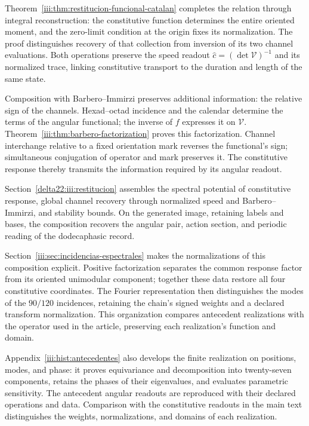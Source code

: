 Theorem~\ref{iii:thm:restitucion-funcional-catalan} completes the
relation through integral reconstruction: the constitutive function
determines the entire oriented moment, and the zero-limit condition
at the origin fixes its normalization. The proof distinguishes recovery
of that collection from inversion of its two channel evaluations.
Both operations preserve the speed readout
$\widehat c=(\det\mathcal V)^{-1}$ and its normalized trace, linking
constitutive transport to the duration and length of the same state.

Composition with Barbero--Immirzi preserves additional information:
the relative sign of the channels. Hexad--octad incidence and the
calendar determine the terms of the angular functional; the inverse
of $f$ expresses it on $\mathcal V$.
Theorem~\ref{iii:thm:barbero-factorization} proves this
factorization. Channel interchange relative to a fixed orientation
mark reverses the functional's sign; simultaneous conjugation of
operator and mark preserves it. The constitutive response thereby
transmits the information required by its angular readout.

\par
Section~\ref{delta22:iii:restitucion} assembles the spectral potential of constitutive response, global channel recovery through normalized speed and Barbero--Immirzi, and stability bounds. On the generated image, retaining labels and bases, the composition recovers the angular pair, action section, and periodic reading of the dodecaphasic record.

Section~\ref{iii:sec:incidencias-espectrales} makes the normalizations
of this composition explicit. Positive factorization separates the
common response factor from its oriented unimodular component;
together these data restore all four constitutive coordinates.
The Fourier representation then distinguishes the modes of the
$90/120$ incidences, retaining the chain's signed weights and a
declared transform normalization. This organization compares
antecedent realizations with the operator used in the article,
preserving each realization's function and domain.

Appendix~\ref{iii:hist:antecedentes} also develops the finite realization
on positions, modes, and phase: it proves equivariance and decomposition
into twenty-seven components, retains the phases of their eigenvalues,
and evaluates parametric sensitivity. The antecedent angular readouts
are reproduced with their declared operations and data. Comparison with
the constitutive readouts in the main text distinguishes the weights,
normalizations, and domains of each realization.

